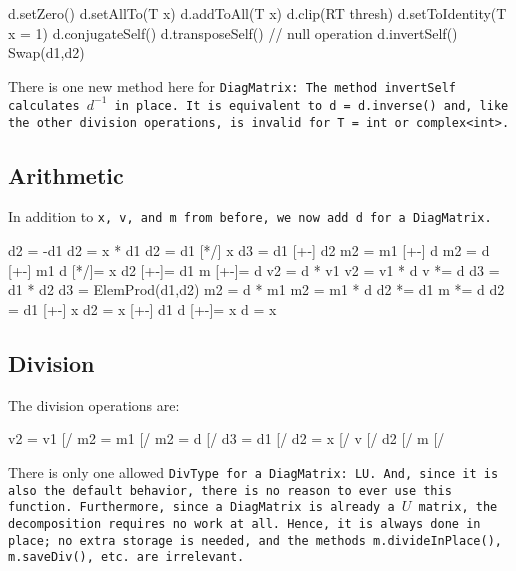 \begin{tmvcode}
d.setZero()
d.setAllTo(T x)
d.addToAll(T x)
d.clip(RT thresh)
d.setToIdentity(T x = 1)
d.conjugateSelf()
d.transposeSelf() // null operation
d.invertSelf()
Swap(d1,d2)
\end{tmvcode}
There is one new method here for \tt{DiagMatrix}: The method \tt{invertSelf}  calculates $d^{-1}$ in place.  
It is equivalent to \tt{d = d.inverse()} and, like the other division operations, is invalid for \tt{T = int} or \tt{complex<int>}.
\vspace{12pt}

\subsection{Arithmetic}
\label{DiagMatrix_Arithmetic}

In addition to \tt{x}, \tt{v}, and \tt{m} from before, we now add \tt{d} for a \tt{DiagMatrix}.

\begin{tmvcode}
d2 = -d1
d2 = x * d1
d2 = d1 [*/] x
d3 = d1 [+-] d2
m2 = m1 [+-] d
m2 = d [+-] m1
d [*/]= x
d2 [+-]= d1
m [+-]= d
v2 = d * v1
v2 = v1 * d
v *= d
d3 = d1 * d2
d3 = ElemProd(d1,d2)
m2 = d * m1
m2 = m1 * d
d2 *= d1
m *= d
d2 = d1 [+-] x
d2 = x [+-] d1
d [+-]= x
d = x
\end{tmvcode}

\subsection{Division}
\label{DiagMatrix_Division}

The division operations are:
\begin{tmvcode}
v2 = v1 [/%
m2 = m1 [/%
m2 = d [/%
d3 = d1 [/%
d2 = x [/%
v [/%
d2 [/%
m [/%
\end{tmvcode}

There is only one allowed \tt{DivType} for a \tt{DiagMatrix}: \tt{LU}. 
And, since it is also the default behavior,
there is no reason to ever use this function.  Furthermore, since a \tt{DiagMatrix}
is already a $U$ matrix, the decomposition requires no work at all.
Hence, it is always done in place; no extra storage is needed, and 
the methods \tt{m.divideInPlace()}, \tt{m.saveDiv()}, etc. are irrelevant.

